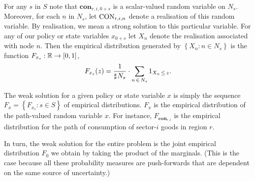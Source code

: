 \documentclass[12pt,a4paper,twoside, draft]{article}
\begin{document}
For any $s$ in $S$ note that $\mathbf{con}_{r, i, \mathfrak{0} + s}$ is a
scalar-valued random variable on $N_s$. 
Moreover, for each $n$ in $N_s$, let $\textup{CON}_{r, i, n}$ denote a
realisation of this random variable.
By realisation, we mean a strong solution to this particular variable.
For any of our policy or state variables $x_{\mathfrak{0}+s}$ let $X_n$ denote
the realisation associated with node $n$.
Then the empirical distribution generated by $\left\{X_n: n \in N_s\right\}$ is
the function
$F_{x_{s}} : \mathbb R \rightarrow [0, 1]$,
\begin{equation}\label{eq-empirical-dbn}
   F_{x_s}(z) = \frac{1}{\mathbin{\sharp}\hskip1pt N_{s}}
   \cdot \sum_{n \,\in\, N_{s}} 1_{X_n \,\leq\, z}.
\end{equation}

The weak solution for a given policy or state variable $x$ is simply the
sequence $F_{x} = \left\{F_{x_{s}}: s \in S\right\}$ of empirical distributions.
$F_{x}$ is the empirical distribution of the path-valued random variable $x$.
For instance, $F_{\mathbf{con}_{r, i}}$ is the empirical distribution for the
path of consumption of sector-$i$ goods in region $r$.

In turn, the weak solution for the entire problem is the joint empirical
distribution $F_{\mathfrak{0}}$ we obtain by taking the product of the
marginals.
(This is the case because all these probability measures are push-forwards that
are dependent on the same source of uncertainty.)
\end{document}
